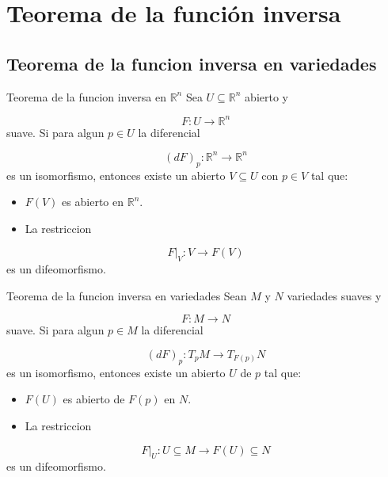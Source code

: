\chapter{Teorema de la función inversa}
\label{ch:teo-10}
\section{Teorema de la funcion inversa en variedades}
\begin{booktheorem}{Teorema de la funcion inversa en $\mathbb R^n$}
Sea $U \subseteq \mathbb R^n$ abierto y

\[
F:U \to \mathbb R^n
\]
suave. Si para algun $p \in U$ la diferencial

\[
(dF)_p:\mathbb R^n \to \mathbb R^n
\]
es un isomorfismo, entonces existe un abierto $V \subseteq U$ con $p \in V$ tal que:

\begin{itemize}
\item $F(V)$ es abierto en $\mathbb R^n$.
\item La restriccion
\end{itemize}
\[
F|_V:V \to F(V)
\]
es un difeomorfismo.

\end{booktheorem}
\begin{bookcorollary}{Teorema de la funcion inversa en variedades}
Sean $M$ y $N$ variedades suaves y

\[
F:M \to N
\]
suave. Si para algun $p \in M$ la diferencial

\[
(dF)_p:T_pM \to T_{F(p)}N
\]
es un isomorfismo, entonces existe un abierto $U$ de $p$ tal que:

\begin{itemize}
\item $F(U)$ es abierto de $F(p)$ en $N$.
\item La restriccion
\end{itemize}
\[
F|_U:U \subseteq M \to F(U) \subseteq N
\]
es un difeomorfismo.

\end{bookcorollary}
